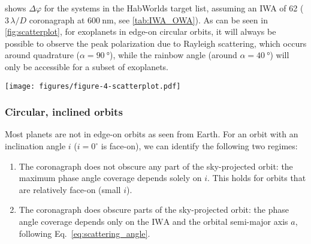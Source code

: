 \documentclass[usenatbib]{mnras}
\newcommand{\IWA}{\ensuremath{\mathrm{IWA}}\xspace}
\newcommand{\HWO}{HabWorlds\xspace}
\begin{document}
 shows $\Delta \varphi$ for the systems in the \HWO target list, assuming an IWA of \qty{62}{\mas} ($3\,\lambda / D$ coronagraph at $\qty{600}{\nano\meter}$, see \cref{tab:IWA_OWA}). 
%
%
As can be seen in \cref{fig:scatterplot}, for exoplanets in edge-on circular orbits, it will always be possible to observe the peak polarization due to Rayleigh scattering, which occurs around quadrature ($\alpha=\qty{90}{\degree}$), while the rainbow angle (around $\alpha=\qty{40}{\degree}$) will only be accessible for a subset of exoplanets.

\begin{figure*}
    \centering
    \texttt{[image: figures/figure-4-scatterplot.pdf]}
    \caption{
        Scatter plot for the \HWO target stars, showing stellar effective temperatures and distances.
        The circle sizes represent the angular separation between the star and its planet (in mas) as presented in the target list.
        The colours show $\Delta \varphi$ for hypothetical planets on circular, edge-on orbits at a semi-major axis $a$ corresponding to an Earth-like instellation and an IWA of \qty{62}{\mas}.
        The colour bar indicates the optical phenomena that can in principle be detected: the phenomena from the bottom of the bar up to the colour of a given circle would be detectable for that planet.
        For example, dark blue circles indicate planets for which most phenomena would be observable: planets that can be observed at the rainbow angle can also be observed at angles exhibiting Rayleigh scattering.
    }
    \label{fig:scatterplot}
\end{figure*}




\subsubsection{Circular, inclined orbits}

Most planets are not in edge-on orbits as seen from Earth.
For an orbit with an inclination angle $i$ ($i=0^\circ$ is face-on), we can identify the following two regimes:%
\begin{enumerate}
    \item The coronagraph does not obscure any part of the sky-projected orbit: 
    the maximum phase angle coverage depends solely on $i$. 
        This holds for orbits that are relatively face-on (small $i$). 
    \item The coronagraph does obscure parts of the sky-projected orbit: the phase angle coverage depends only on the \IWA and the orbital semi-major axis $a$, following Eq.~\ref{eq:scattering_angle}. 
\end{enumerate}
\end{document}
